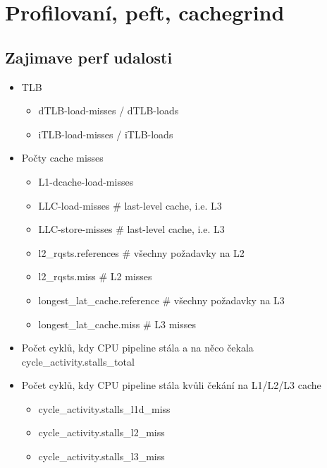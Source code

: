 \section{\texorpdfstring{Profilovaní, peft, cachegrind}{Profilovaní, peft, cachegrind}}
\vspace{5mm}
\large

\subsection{Zajimave perf udalosti}
\begin{itemize}
	\item TLB
		\begin{itemize}
			\item dTLB-load-misses / dTLB-loads
			\item iTLB-load-misses / iTLB-loads
		\end{itemize}
	\item Počty cache misses
		\begin{itemize}
			\item L1-dcache-load-misses
			\item LLC-load-misses \# last-level cache, i.e. L3
			\item LLC-store-misses \# last-level cache, i.e. L3
			\item l2\_rqsts.references \# všechny požadavky na L2
			\item l2\_rqsts.miss \# L2 misses
			\item longest\_lat\_cache.reference \# všechny požadavky na L3
			\item longest\_lat\_cache.miss \# L3 misses
		\end{itemize}
	\item Počet cyklů, kdy CPU pipeline stála a na něco čekala \\
	cycle\_activity.stalls\_total
	\item Počet cyklů, kdy CPU pipeline stála kvůli čekání na L1/L2/L3 cache
		\begin{itemize}
			\item cycle\_activity.stalls\_l1d\_miss
			\item cycle\_activity.stalls\_l2\_miss
			\item cycle\_activity.stalls\_l3\_miss
		\end{itemize}
\end{itemize}

